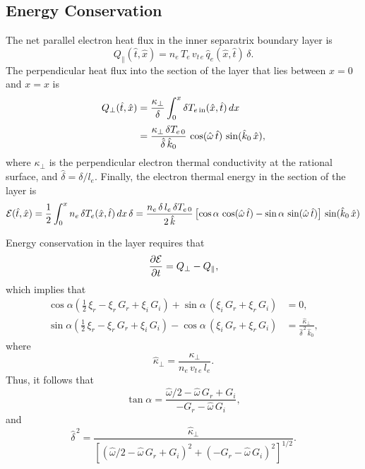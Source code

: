 \documentclass[12pt,prb,aps]{revtex4-1}
\begin{document}
\subsection{Energy Conservation}
The net parallel electron heat flux in the inner separatrix boundary layer is
\begin{equation}
Q_\parallel (\hat{t},\hat{x})= n_e\,T_e\,v_{t\,e}\,\hat{q}_e(\hat{x},\hat{t})\,\delta.
\end{equation}
The perpendicular heat flux into the section of the layer that lies between $x=0$ and $x=x$ is
\begin{align}
Q_\perp (\hat{t},\hat{x}) &= \frac{\kappa_\perp}{\delta} \int_0^x\delta T_{e\,{\rm in}}(\hat{x},\hat{t})\,dx\nonumber\\[0.5ex]
&= \frac{\kappa_\perp\,\delta T_{e\,0}}{\hat{\delta}\,\hat{k}_0}\,\cos(\hat{\omega}\,\hat{t})\,\sin(\hat{k}_0\,\hat{x}),
\end{align}
where $\kappa_\perp$ is the perpendicular electron thermal conductivity at the rational surface, and $\hat{\delta}=\delta/l_e$. Finally, the  electron thermal energy in the section of the layer is
\begin{equation}
{\cal E}(\hat{t},\hat{x})=\frac{1}{2}\int_0^x n_e\,\delta T_e(\hat{x},\hat{t})\,dx\,\delta = \frac{n_e\,\delta\,l_e\,\delta T_{e\,0}}{2\,\hat{k}}\left[\cos\alpha\,\cos(\hat{\omega}\,\hat{t})-\sin\alpha\,\sin(\hat{\omega}\,\hat{t})\right]\,
\sin(\hat{k}_0\,\hat{x})
\end{equation}

Energy conservation in the layer requires that
\begin{equation}
\frac{\partial{\cal E}}{\partial t} = Q_\perp-Q_\parallel,
\end{equation}
which implies that
\begin{align}
\cos\alpha\left(\frac{1}{2}\,\xi_r-\xi_r\,G_r+\xi_i\,G_i\right)+\sin\alpha\,(\xi_i\,G_r+\xi_r\,G_i) &= 0,\\[0.5ex]
\sin\alpha\left(\frac{1}{2}\,\xi_r-\xi_r\,G_r+\xi_i\,G_i\right)-\cos\alpha\,(\xi_i\,G_r+\xi_r\,G_i)&= \frac{\hat{\kappa}_\perp}{\hat{\delta}^{\,2}\,\hat{k}_0},
\end{align}
where
\begin{equation}
\hat{\kappa}_\perp =\frac{\kappa_\perp}{n_e\,v_{t\,e}\,l_e}.
\end{equation}
Thus, it follows that
\begin{equation}
\tan\alpha = \frac{\hat{\omega}/2 -\hat{\omega}\,G_r + G_i}{-G_r-\hat{\omega}\,G_i},
\end{equation}
and
\begin{equation}
\hat{\delta}^{\,2} = \frac{\hat{\kappa}_\perp}{[(\hat{\omega}/2 - \hat{\omega}\,G_r+G_i)^2 + (-G_r-\hat{\omega}\,G_i)^2]^{1/2}}.
\end{equation}
\end{document}
